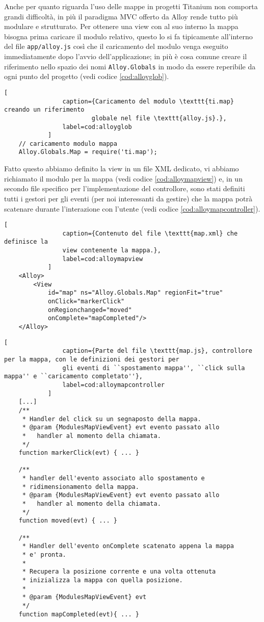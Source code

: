 			Anche per quanto riguarda l'uso delle mappe in progetti Titanium
			non comporta grandi difficoltà, in più il paradigma MVC
			offerto da Alloy rende tutto più modulare e strutturato. Per ottenere
			una view con al suo interno la mappa bisogna prima caricare il modulo
			relativo, questo lo si fa tipicamente all'interno del file
			\texttt{app/alloy.js} così che il caricamento del modulo venga
			eseguito immediatamente dopo l'avvio dell'applicazione; in più è cosa
			comune creare il riferimento nello spazio dei nomi \texttt{Alloy.Globals}
			in modo da essere reperibile da ogni punto del progetto (vedi codice \ref{cod:alloyglob}).
			\begin{lstlisting}[
				caption={Caricamento del modulo \texttt{ti.map} creando un riferimento
				        globale nel file \texttt{alloy.js}.},
				label=cod:alloyglob
			]
	// caricamento modulo mappa
	Alloy.Globals.Map = require('ti.map');
			\end{lstlisting}
			Fatto questo abbiamo definito la view in un file XML dedicato, vi abbiamo richiamato
			il modulo per la mappa (vedi codice \ref{cod:alloymapview}) e, in un secondo file \js{} specifico per
			l'implementazione del controllore, sono stati definiti tutti i
			gestori per gli eventi (per noi interessanti da gestire) che la
			mappa potrà scatenare durante l'interazione con l'utente (vedi codice \ref{cod:alloymapcontroller}).
			\begin{lstlisting}[
				caption={Contenuto del file \texttt{map.xml} che definisce la
				view contenente la mappa.},
				label=cod:alloymapview
			]
	<Alloy>
		<View
			id="map" ns="Alloy.Globals.Map" regionFit="true"
			onClick="markerClick"
			onRegionchanged="moved"
			onComplete="mapCompleted"/>
	</Alloy>
			\end{lstlisting}
			\begin{lstlisting}[
				caption={Parte del file \texttt{map.js}, controllore per la mappa, con le definizioni dei gestori per
				gli eventi di ``spostamento mappa'', ``click sulla mappa'' e ``caricamento completato''},
				label=cod:alloymapcontroller
			]
	[...]
	/**
	 * Handler del click su un segnaposto della mappa.
	 * @param {ModulesMapViewEvent} evt evento passato allo
	 *   handler al momento della chiamata.
	 */
	function markerClick(evt) {	...	}

	/**
	 * handler dell'evento associato allo spostamento e
	 * ridimensionamento della mappa.
	 * @param {ModulesMapViewEvent} evt evento passato allo
	 *   handler al momento della chiamata.
	 */
	function moved(evt) { ... }

	/**
	 * Handler dell'evento onComplete scatenato appena la mappa
	 * e' pronta.
	 *
	 * Recupera la posizione corrente e una volta ottenuta
	 * inizializza la mappa con quella posizione.
	 *
	 * @param {ModulesMapViewEvent} evt
	 */
	function mapCompleted(evt){ ... }

			\end{lstlisting}
